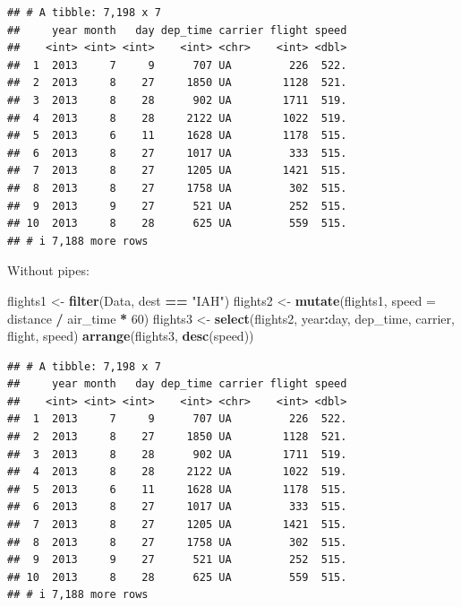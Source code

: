 \documentclass[
]{book}
\newenvironment{Shaded}{\begin{snugshade}}{\end{snugshade}}
\newcommand{\AttributeTok}[1]{\textcolor[rgb]{0.13,0.29,0.53}{#1}}
\newcommand{\DecValTok}[1]{\textcolor[rgb]{0.00,0.00,0.81}{#1}}
\newcommand{\FunctionTok}[1]{\textcolor[rgb]{0.13,0.29,0.53}{\textbf{#1}}}
\newcommand{\NormalTok}[1]{#1}
\newcommand{\OtherTok}[1]{\textcolor[rgb]{0.56,0.35,0.01}{#1}}
\newcommand{\SpecialCharTok}[1]{\textcolor[rgb]{0.81,0.36,0.00}{\textbf{#1}}}
\newcommand{\StringTok}[1]{\textcolor[rgb]{0.31,0.60,0.02}{#1}}
\theoremstyle{definition}
\theoremstyle{definition}
\theoremstyle{definition}
\theoremstyle{definition}
\theoremstyle{remark}
\begin{document}
\begin{verbatim}
## # A tibble: 7,198 x 7
##     year month   day dep_time carrier flight speed
##    <int> <int> <int>    <int> <chr>    <int> <dbl>
##  1  2013     7     9      707 UA         226  522.
##  2  2013     8    27     1850 UA        1128  521.
##  3  2013     8    28      902 UA        1711  519.
##  4  2013     8    28     2122 UA        1022  519.
##  5  2013     6    11     1628 UA        1178  515.
##  6  2013     8    27     1017 UA         333  515.
##  7  2013     8    27     1205 UA        1421  515.
##  8  2013     8    27     1758 UA         302  515.
##  9  2013     9    27      521 UA         252  515.
## 10  2013     8    28      625 UA         559  515.
## # i 7,188 more rows
\end{verbatim}

Without pipes:

\begin{Shaded}
\begin{Highlighting}[]
\NormalTok{flights1 }\OtherTok{\textless{}{-}} \FunctionTok{filter}\NormalTok{(Data, dest }\SpecialCharTok{==} \StringTok{"IAH"}\NormalTok{)}
\NormalTok{flights2 }\OtherTok{\textless{}{-}} \FunctionTok{mutate}\NormalTok{(flights1, }\AttributeTok{speed =}\NormalTok{ distance }\SpecialCharTok{/}\NormalTok{ air\_time }\SpecialCharTok{*} \DecValTok{60}\NormalTok{)}
\NormalTok{flights3 }\OtherTok{\textless{}{-}} \FunctionTok{select}\NormalTok{(flights2, year}\SpecialCharTok{:}\NormalTok{day, dep\_time, carrier, flight, speed)}
\FunctionTok{arrange}\NormalTok{(flights3, }\FunctionTok{desc}\NormalTok{(speed))}
\end{Highlighting}
\end{Shaded}

\begin{verbatim}
## # A tibble: 7,198 x 7
##     year month   day dep_time carrier flight speed
##    <int> <int> <int>    <int> <chr>    <int> <dbl>
##  1  2013     7     9      707 UA         226  522.
##  2  2013     8    27     1850 UA        1128  521.
##  3  2013     8    28      902 UA        1711  519.
##  4  2013     8    28     2122 UA        1022  519.
##  5  2013     6    11     1628 UA        1178  515.
##  6  2013     8    27     1017 UA         333  515.
##  7  2013     8    27     1205 UA        1421  515.
##  8  2013     8    27     1758 UA         302  515.
##  9  2013     9    27      521 UA         252  515.
## 10  2013     8    28      625 UA         559  515.
## # i 7,188 more rows
\end{verbatim}
\end{document}
